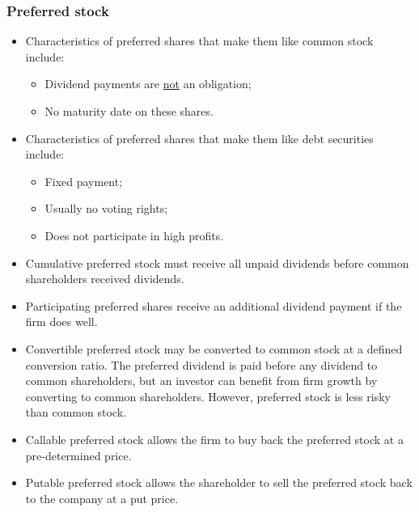 \documentclass[../notes_compiled.tex]{subfiles}
\begin{document}
\subsubsection{Preferred stock}
\begin{itemize}
\item Characteristics of preferred shares that make them like common stock include:
\begin{itemize}
\item Dividend payments are \underline{not} an obligation;
\item No maturity date on these shares.
\end{itemize}

\item Characteristics of preferred shares that make them like debt securities include:
\begin{itemize}
\item Fixed payment;
\item Usually no voting rights;
\item Does not participate in high profits.

\end{itemize}

\item Cumulative preferred stock must receive all unpaid dividends before common shareholders received dividends.
\item Participating preferred shares receive an additional dividend payment if the firm does well.
\item Convertible preferred stock may be converted to common stock at a defined conversion ratio. The preferred dividend is paid before any dividend to common shareholders, but an investor can benefit from firm growth by converting to common shareholders. However, preferred stock is less risky than common stock.
\item Callable preferred stock allows the firm to buy back the preferred stock at a pre-determined price.
\item Putable preferred stock allows the shareholder to sell the preferred stock back to the company at a put price.

\end{itemize}
\end{document}

